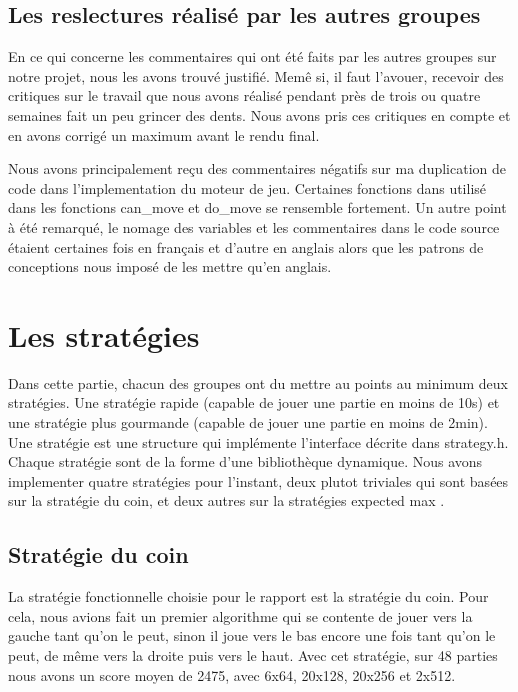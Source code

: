 \documentclass[12pt]{article}
\begin{document}
\subsection{Les reslectures r\'ealis\'e par les autres groupes}
\label{notre_etude}
En ce qui concerne les commentaires qui ont \'et\'e faits par les autres groupes
sur notre projet, nous les avons trouv\'e justifi\'e. Mem\^e si, il faut
l'avouer, recevoir des \og critiques \fg{} sur le travail que nous avons
r\'ealis\'e pendant pr\`es de trois ou quatre semaines fait un peu grincer des
dents. Nous avons pris ces critiques en compte et en avons corrig\'e un
maximum avant le rendu final. 
\par Nous avons principalement reçu des commentaires n\'egatifs sur ma
duplication de code dans l'implementation du moteur de jeu. Certaines fonctions
dans utilis\'e dans les fonctions \og can\_move \fg{} et \og do\_move \fg{} se
rensemble fortement. Un autre point \`a \'et\'e remarqu\'e, le nomage des
variables et les commentaires dans le code source \'etaient certaines fois en
français et d'autre en anglais alors que les patrons de conceptions nous
impos\'e de les mettre qu'en anglais.

\newpage
\section{Les strat\'egies}
Dans cette partie, chacun des groupes ont du mettre au points au minimum deux
strat\'egies. Une strat\'egie rapide (capable de jouer une partie en moins de
10s) et une strat\'egie plus gourmande (capable de jouer une partie en moins de
2min). Une strat\'egie est une structure qui impl\'emente l’interface d\'ecrite
dans strategy.h. Chaque strat\'egie sont de la forme d’une biblioth\`eque
dynamique. Nous avons implementer quatre strat\'egies pour l'instant, deux
plutot triviales qui sont basées sur la strat\'egie du coin, et deux autres sur
la strat\'egies \og expected max \fg{}. 

\subsection{Stratégie du coin}
La stratégie fonctionnelle choisie pour le rapport est la stratégie du coin.
Pour cela, nous avions fait un premier algorithme qui se contente de jouer vers
la gauche tant qu'on le peut, sinon il joue vers le bas encore une fois tant
qu'on le peut, de même vers la droite puis vers le haut. Avec cet stratégie, sur
48 parties nous avons un score moyen de 2475, avec 6x64, 20x128, 20x256 et
2x512.
\end{document}
